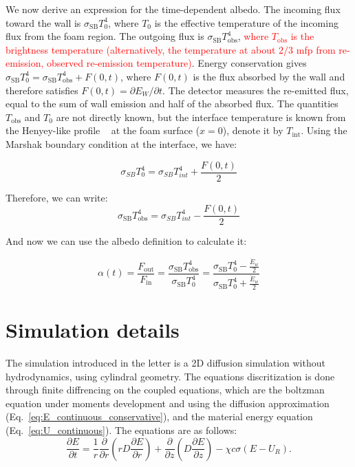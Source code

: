 \documentclass[11pt]{article}
\begin{document}
We now derive an expression for the time-dependent albedo. The incoming flux toward the wall is $\sigma_{\mathrm{SB}}T_0^4$, where $T_0$ is the effective temperature of the incoming flux from the foam region. The outgoing flux is $\sigma_{\mathrm{SB}}T_{\mathrm{obs}}^4$, \textcolor{red}{where $T_{\mathrm{obs}}$ is the brightness temperature (alternatively, the temperature at about $2/3$ mfp from re-emission, observed re-emission temperature)}. Energy conservation gives
$\sigma_{\mathrm{SB}}T_0^4 = \sigma_{\mathrm{SB}}T_{\mathrm{obs}}^4 + F(0,t)$,
where $F(0,t)$ is the flux absorbed by the wall and therefore satisfies $F(0,t)=\partial E_W/\partial t$. The detector measures the re-emitted flux, equal to the sum of wall emission and half of the absorbed flux. The quantities $T_{\mathrm{obs}}$ and $T_0$ are not directly known, but the interface temperature is known from the Henyey-like profile ~\cite{Hammer2003} at the foam surface ($x=0$), denote it by $T_{\mathrm{int}}$. Using the Marshak boundary condition at the interface, we have:

\begin{equation}
\sigma_{SB} T_{0}^4 = \sigma_{SB} T_{int}^4 + \frac{F(0,t)}{2}
\end{equation}

Therefore, we can write:
\begin{equation}
\sigma_{\mathrm{SB}}T_{\mathrm{obs}}^4 = \sigma_{SB} T_{int}^4 - \frac{F(0,t)}{2}
\end{equation}

And now we can use the albedo definition to calculate it:

\begin{equation}
\alpha (t)
=
\frac{F_{\text{out}}}{F_{\text{in}}}
=
\frac{\sigma_{\mathrm{SB}}T_{\mathrm{obs}}^4}{\sigma_{\mathrm{SB}}T_0^4}
=
\frac{\sigma_{\mathrm{SB}}T_0^4 - \frac{\dot{E}_w}{2}}{\sigma_{\mathrm{SB}}T_0^4 + \frac{\dot{E}_w}{2}}
\end{equation}
\section{Simulation details}
The simulation introduced in the letter is a 2D diffusion simulation without hydrodynamics, using cylindral geometry. The equations discritization is done through finite diffrencing on the coupled equations, which are the boltzman equation under moments development and using the diffusion approximation (Eq.~\eqref{eq:E_continuous_conservative}), and the material energy equation (Eq.~\eqref{eq:U_continuous}). The equations are as follows:
\begin{equation}
\frac{\partial E}{\partial t}
=
\frac{1}{r}\frac{\partial}{\partial r}\left(rD\frac{\partial E}{\partial r}\right) + \frac{\partial}{\partial z}\left(D\frac{\partial E}{\partial z}\right)
-
\chi c\sigma(E - U_R).
\label{eq:E_continuous_conservative}
\end{equation}
\end{document}
